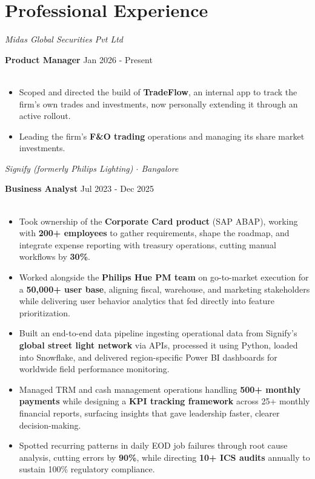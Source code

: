 \documentclass[10pt]{article}
\newcommand{\heading}[4]{
  \textbf{#1} \hfill #2 \\
  \textit{#3} \hfill \textit{#4} \\[-4pt]
}
\begin{document}
\section*{Professional Experience}
\textit{Midas Global Securities Pvt Ltd} \\[2pt]
\vspace{4pt}
\heading{Product Manager}{Jan 2026 - Present}{}{}
\vspace{-22pt}
\begin{itemize}
  \item Scoped and directed the build of \textbf{TradeFlow}, an internal app to track the firm's own trades and investments, now personally extending it through an active rollout.
  \item Leading the firm's \textbf{F\&O trading} operations and managing its share market investments.
\end{itemize}
\vspace{4pt}
\textit{Signify (formerly Philips Lighting) $\cdot$ Bangalore} \\[2pt]
\vspace{4pt}
\heading{Business Analyst}{Jul 2023 - Dec 2025}{}{}
\vspace{-22pt}
\begin{itemize}
  \item Took ownership of the \textbf{Corporate Card product} (SAP ABAP), working with \textbf{200+ employees} to gather
  requirements, shape the roadmap, and integrate expense reporting with treasury operations, cutting manual workflows by \textbf{30\%}.
  \item Worked alongside the \textbf{Philips Hue PM team} on go-to-market execution for a \textbf{50,000+ user base}, aligning
  fiscal, warehouse, and marketing stakeholders while delivering user behavior analytics that fed directly into feature prioritization.
  \item Built an end-to-end data pipeline ingesting operational data from Signify's \textbf{global street light network} via APIs,
  processed it using Python, loaded into Snowflake, and delivered region-specific Power BI dashboards for worldwide field performance
  monitoring.
  \item Managed TRM and cash management operations handling \textbf{500+ monthly payments} while designing a \textbf{KPI tracking
  framework} across 25+ monthly financial reports, surfacing insights that gave leadership faster, clearer decision-making.
  \item Spotted recurring patterns in daily EOD job failures through root cause analysis, cutting errors by \textbf{90\%}, while directing
  \textbf{10+ ICS audits} annually to sustain 100\% regulatory compliance.
\end{itemize}
\end{document}
